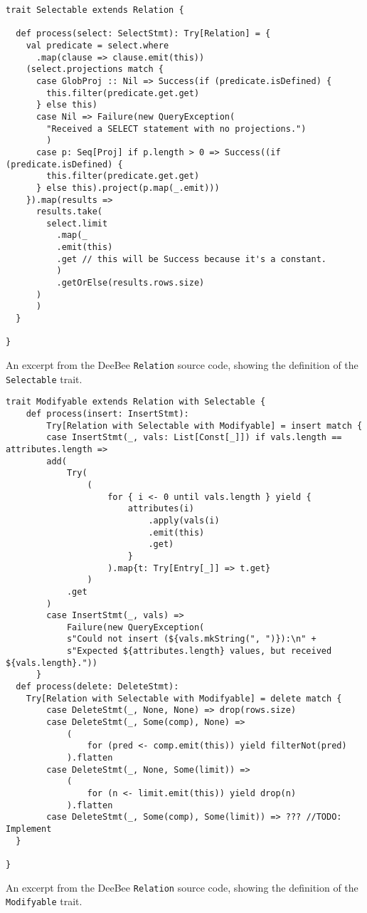 \begin{listing}[H]
    \begin{verbatim}
trait Selectable extends Relation {

  def process(select: SelectStmt): Try[Relation] = {
    val predicate = select.where
      .map(clause => clause.emit(this))
    (select.projections match {
      case GlobProj :: Nil => Success(if (predicate.isDefined) {
        this.filter(predicate.get.get)
      } else this)
      case Nil => Failure(new QueryException(
        "Received a SELECT statement with no projections.")
        )
      case p: Seq[Proj] if p.length > 0 => Success((if (predicate.isDefined) {
        this.filter(predicate.get.get)
      } else this).project(p.map(_.emit)))
    }).map(results =>
      results.take(
        select.limit
          .map(_
          .emit(this)
          .get // this will be Success because it's a constant.
          )
          .getOrElse(results.rows.size)
      )
      )
  }

}
    \end{verbatim}
    \caption{An excerpt from the DeeBee \texttt{Relation} source code, showing the definition of the \texttt{Selectable} trait.}
    \label{lst:selectable}
\end{listing}

\begin{listing}[H]
    \begin{verbatim}
trait Modifyable extends Relation with Selectable {
    def process(insert: InsertStmt): 
        Try[Relation with Selectable with Modifyable] = insert match {
        case InsertStmt(_, vals: List[Const[_]]) if vals.length == attributes.length => 
        add(
            Try(
                (
                    for { i <- 0 until vals.length } yield {
                        attributes(i)
                            .apply(vals(i)
                            .emit(this)
                            .get)
                        }
                    ).map{t: Try[Entry[_]] => t.get}
                )
            .get
        )
        case InsertStmt(_, vals) => 
            Failure(new QueryException(
            s"Could not insert (${vals.mkString(", ")}):\n" +
            s"Expected ${attributes.length} values, but received ${vals.length}."))
      }
  def process(delete: DeleteStmt): 
    Try[Relation with Selectable with Modifyable] = delete match {
        case DeleteStmt(_, None, None) => drop(rows.size)
        case DeleteStmt(_, Some(comp), None) => 
            (
                for (pred <- comp.emit(this)) yield filterNot(pred)
            ).flatten
        case DeleteStmt(_, None, Some(limit)) => 
            (
                for (n <- limit.emit(this)) yield drop(n)
            ).flatten
        case DeleteStmt(_, Some(comp), Some(limit)) => ??? //TODO: Implement
  }

}
    \end{verbatim}
    \caption{An excerpt from the DeeBee \texttt{Relation} source code, showing the definition of the \texttt{Modifyable} trait.}
    \label{lst:modifyable}
\end{listing}


